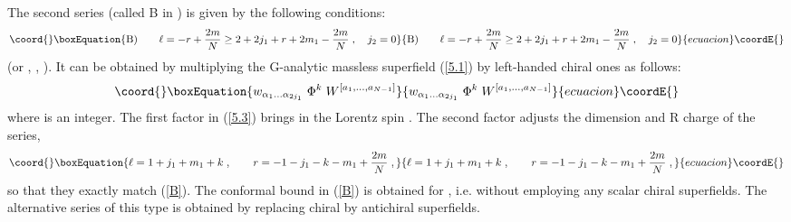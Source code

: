 \documentclass[a4paper,12pt]{article}
\begin{document}
The second series (called B in \cite{FS1}) is given by the 
following conditions:  
\begin{equation}\coord{}\boxEquation{\label{B}
  {\rm B)}\qquad \ell = -r+ {2m\over N} \geq 2+2j_1+r+2m_1 -{2m\over 
N}\;, \quad j_2=0
}{{\rm B)}\qquad \ell = -r+ {2m\over N} \geq 2+2j_1+r+2m_1 -{2m\over 
N}\;, \quad j_2=0
}{ecuacion}\coordE{}\end{equation}
(or  \coordHE{}, \coordHE{}, \coordHE{}). It can be obtained by 
multiplying the G-analytic massless superfield (\ref{5.1}) by 
left-handed chiral ones as follows: 
\begin{equation}\coord{}\boxEquation{\label{5.3}
  w_{\alpha_1\ldots\alpha_{2j_1}}\;\Phi^k\; W^{[a_1,\ldots,a_{N-1}]}
}{w_{\alpha_1\ldots\alpha_{2j_1}}\;\Phi^k\; W^{[a_1,\ldots,a_{N-1}]}
}{ecuacion}\coordE{}\end{equation}
where \coordHE{} is an integer. The first factor in (\ref{5.3}) 
brings in the Lorentz spin \coordHE{}. The second factor adjusts 
the dimension and R charge of the series, 
\begin{equation}\coord{}\boxEquation{\label{5.4}
\ell = 1+j_1+m_1+k\;, \qquad r=-1-j_1-k - m_1 + {2m\over N}\;, 
}{\ell = 1+j_1+m_1+k\;, \qquad r=-1-j_1-k - m_1 + {2m\over N}\;, 
}{ecuacion}\coordE{}\end{equation}
so that they exactly match (\ref{B}). The conformal bound in  
(\ref{B}) is obtained for \coordHE{}, i.e. without employing any scalar 
chiral superfields. The alternative series of this type is 
obtained by replacing chiral by antichiral superfields. 
\end{document}
